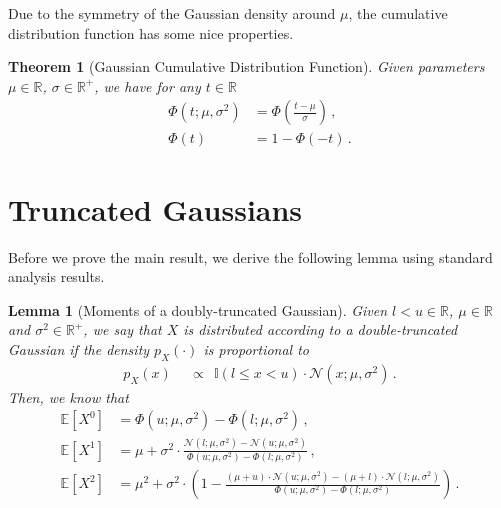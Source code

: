 \documentclass[a4paper]{article}
\newcommand{\Real}{{\mathbb R}}
\newcommand{\Normal}[3]{{\mathcal N} \left({#1};{#2},{#3}\right)}
\newcommand{\NormalCDF}[3]{\Phi \left({#1};{#2},{#3}\right)}
\newcommand{\NormalStandardCDF}[1]{\Phi \left({#1}\right)}
\newcommand{\expect}[1]{{\mathbb E \left[ {#1} \right]}}
\newcommand{\identity}[1]{{{\mathbb{I}} \left( {#1} \right)}}
\newtheorem{theorem}{Theorem}
\newtheorem{lemma}{Lemma}
\theoremstyle{definition}
\begin{document}
Due to the symmetry of the Gaussian density around $\mu$, the cumulative distribution function has some nice properties.
\begin{theorem}[Gaussian Cumulative Distribution Function] \label{thm:properties_of_Gaussian_CDF}
    Given parameters $\mu \in \Real$, $\sigma \in \Real^+$, we have for any $t\in \Real$
    \begin{align}
        \NormalCDF{t}{\mu}{\sigma^2} & = \NormalStandardCDF{\frac{t-\mu}{\sigma}} \,, \\
        \NormalStandardCDF{t}        & = 1-\NormalStandardCDF{-t} \,.
    \end{align}
\end{theorem}

\section*{Truncated Gaussians}

Before we prove the main result, we derive the following lemma using standard analysis results.
\begin{lemma}[Moments of a doubly-truncated Gaussian] \label{lem:moments_doubly_truncated_gaussian} Given $l < u \in \Real$, $\mu \in \Real$ and $\sigma^2 \in \Real^+$, we say that $X$ is distributed according to a double-truncated Gaussian if the density $p_X(\cdot)$ is proportional to 
    \begin{align}
        p_X(x)\ \  & \propto \ \ \identity{l \leq x < u} \cdot \Normal{x}{\mu}{\sigma^2} \nonumber \,.
    \end{align}
    Then, we know that
    \begin{align}
        \expect{X^0} & = \NormalCDF{u}{\mu}{\sigma^2} - \NormalCDF{l}{\mu}{\sigma^2} \,, \label{eq:doubly_truncated_gaussian_zeroth_moment} \\
        \expect{X^1} & = \mu + \sigma^2 \cdot \frac{\Normal{l}{\mu}{\sigma^2} - \Normal{u}{\mu}{\sigma^2}}{\NormalCDF{u}{\mu}{\sigma^2} - \NormalCDF{l}{\mu}{\sigma^2}} \,, \label{eq:doubly_truncated_gaussian_first_moment} \\
        \expect{X^2} & = \mu^2 + \sigma^2 \cdot \left( 1 - \frac{\left( \mu + u \right) \cdot \Normal{u}{\mu}{\sigma^2} - \left( \mu + l \right) \cdot \Normal{l}{\mu}{\sigma^2}}{\NormalCDF{u}{\mu}{\sigma^2} - \NormalCDF{l}{\mu}{\sigma^2}} \right) \,. \label{eq:doubly_truncated_gaussian_second_moment} 
    \end{align}
\end{lemma}
    
\end{document}
